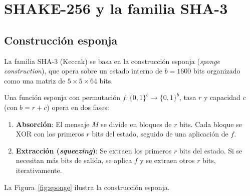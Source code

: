 \section{SHAKE-256 y la familia SHA-3}
\label{sec:shake256}

\subsection{Construcción esponja}

La familia SHA-3 (Keccak) se basa en la construcción esponja (\emph{sponge construction}), que opera sobre un estado interno de $b = 1600$ bits organizado como una matriz de $5 \times 5 \times 64$ bits.

\begin{definicion}
Una función esponja con permutación $f: \{0,1\}^b \to \{0,1\}^b$, tasa $r$ y capacidad $c$ (con $b = r + c$) opera en dos fases:
\begin{enumerate}
  \item \textbf{Absorción}: El mensaje $M$ se divide en bloques de $r$ bits. Cada bloque se XOR con los primeros $r$ bits del estado, seguido de una aplicación de $f$.
  \item \textbf{Extracción (\emph{squeezing})}: Se extraen los primeros $r$ bits del estado. Si se necesitan más bits de salida, se aplica $f$ y se extraen otros $r$ bits, iterativamente.
\end{enumerate}
\end{definicion}

La Figura~\ref{fig:sponge} ilustra la construcción esponja.

